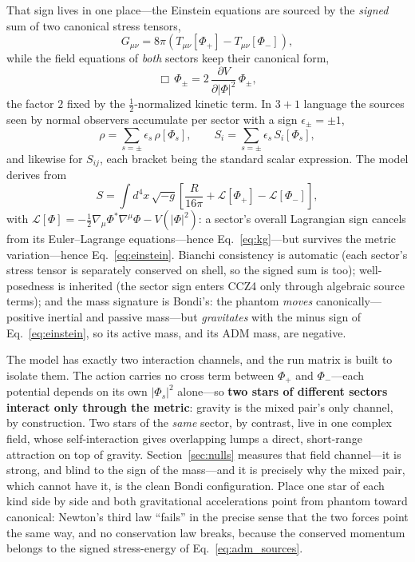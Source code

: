 \documentclass[twocolumn,floatfix,aps,prd,nofootinbib]{revtex4-2}
\begin{document}
That sign lives in one place---the Einstein equations are sourced by the \emph{signed} sum of two canonical stress tensors,
\begin{equation}
G_{\mu\nu}=8\pi\left(T_{\mu\nu}[\Phi_+]-T_{\mu\nu}[\Phi_-]\right),
\label{eq:einstein}
\end{equation}
while the field equations of \emph{both} sectors keep their canonical form,
\begin{equation}
\Box\,\Phi_\pm=2\,\frac{\partial V}{\partial|\Phi|^2}\,\Phi_\pm ,
\label{eq:kg}
\end{equation}
the factor $2$ fixed by the $\tfrac12$-normalized kinetic term. In $3{+}1$ language the sources seen by normal observers accumulate per sector with a sign $\epsilon_\pm=\pm1$,
\begin{equation}
\rho=\sum_{s=\pm}\epsilon_s\,\rho[\Phi_s],\qquad
S_i=\sum_{s=\pm}\epsilon_s\,S_i[\Phi_s],
\label{eq:adm_sources}
\end{equation}
and likewise for $S_{ij}$, each bracket being the standard scalar expression. The model derives from
\begin{equation}
S=\int d^4x\,\sqrt{-g}\left[\frac{R}{16\pi}+\mathcal{L}[\Phi_+]-\mathcal{L}[\Phi_-]\right],
\label{eq:action}
\end{equation}
with $\mathcal{L}[\Phi]=-\tfrac12\nabla_\mu\Phi^*\nabla^\mu\Phi-V(|\Phi|^2)$: a sector's overall Lagrangian sign cancels from its Euler--Lagrange equations---hence Eq.~\eqref{eq:kg}---but survives the metric variation---hence Eq.~\eqref{eq:einstein}. Bianchi consistency is automatic (each sector's stress tensor is separately conserved on shell, so the signed sum is too); well-posedness is inherited (the sector sign enters CCZ4 only through algebraic source terms); and the mass signature is Bondi's: the phantom \emph{moves} canonically---positive inertial and passive mass---but \emph{gravitates} with the minus sign of Eq.~\eqref{eq:einstein}, so its active mass, and its ADM mass, are negative.

The model has exactly two interaction channels, and the run matrix is built to isolate them. The action carries no cross term between $\Phi_+$ and $\Phi_-$---each potential depends on its own $|\Phi_s|^2$ alone---so \textbf{two stars of different sectors interact only through the metric}: gravity is the mixed pair's only channel, by construction. Two stars of the \emph{same} sector, by contrast, live in one complex field, whose self-interaction gives overlapping lumps a direct, short-range attraction on top of gravity. Section~\ref{sec:nulls} measures that field channel---it is strong, and blind to the sign of the mass---and it is precisely why the mixed pair, which cannot have it, is the clean Bondi configuration. Place one star of each kind side by side and both gravitational accelerations point from phantom toward canonical: Newton's third law ``fails'' in the precise sense that the two forces point the same way, and no conservation law breaks, because the conserved momentum belongs to the signed stress-energy of Eq.~\eqref{eq:adm_sources}.
\end{document}

